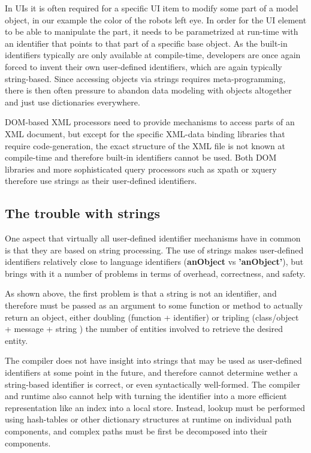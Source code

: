 \documentclass[preprint,authoryear]{acm_proc_article-sp}
\begin{document}
In UIs it is often required for
a specific UI item to modify some part of a model object, in our
example the color of the robots left eye.  In order for the UI element to be
able to manipulate the part, it needs to be parametrized at run-time with
an identifier that points to that part of a specific base object.   As the built-in
 identifiers typically are only available at compile-time, developers are
 once again forced to invent their own user-defined identifiers, which are again 
 typically string-based.  Since accessing objects via strings requires
 meta-programming, there is then often pressure to abandon data
 modeling with objects altogether and just use dictionaries everywhere.


DOM-based XML processors need to provide mechanisms to access parts of
an XML document, but except for the specific XML-data binding libraries that
require code-generation, the exact structure of the XML file is not known at 
compile-time and therefore built-in identifiers cannot be used.  Both DOM libraries
and more sophisticated query processors such as xpath or xquery therefore use
strings as their user-defined identifiers.




\subsection{The trouble with strings}
\label{stringtrouble}

One aspect that virtually all user-defined identifier mechanisms have in common is that they
are based on string processing.  The use of strings makes user-defined identifiers relatively
close to language identifiers ({\bf \hbox{anObject}} vs {\bf \hbox{'anObject'}}), but brings with it a number of problems in terms of overhead, correctness, and safety.

As shown above, the first problem is that a string is not an identifier, and therefore
must be passed as an argument to some function or method to actually return
 an object, either doubling (function + identifier) or tripling (class/object + message + string ) the number of entities involved to retrieve the desired entity.  

The compiler does not have insight into strings that may be used as user-defined 
identifiers at some point in the future, and therefore cannot determine wether 
a string-based identifier is correct, or even syntactically well-formed.   The compiler
and runtime also cannot help with turning the identifier into a more efficient representation
like an index into a local store.  Instead, lookup must be performed using hash-tables
or other dictionary structures at runtime on individual path components, 
and complex paths must be first be decomposed into their components.
\end{document}
